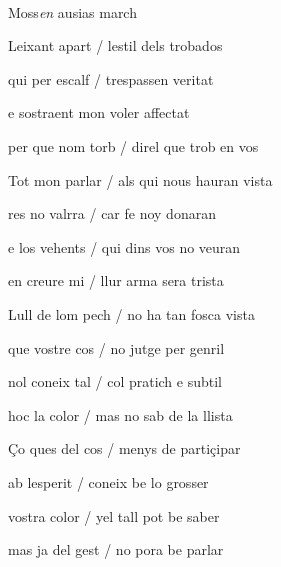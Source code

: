 \documentclass[12pt]{article}
\renewcommand{\espaiAbansEtiquetaPoema}{\vspace{0ex}}
\begin{document}
\begin{estrofa}

\espaiAbansEtiquetaPoema

\\

\begin{rubrica}

Moss\textit{en} ausias march

\end{rubrica}

\end{estrofa}


\begin{estrofa}

 Leixant apart / lestil dels trobados

 qui per escalf / trespassen veritat

 e sostraent mon voler affectat

 per que nom torb / direl que trob en vos

 Tot mon parlar / als qui nous hauran vista

 res no valrra / car fe noy donaran

 e los vehents / qui dins vos no veuran

 en creure mi / llur arma sera trista

\end{estrofa}



\begin{estrofa}

 Lull de lom pech / no ha tan fosca vista

 que vostre cos / no jutge per genril

 nol coneix tal / col pratich e subtil

 hoc la color / mas no sab de la llista

 \c{C}o ques del cos / menys de parti\c{c}ipar

 ab lesperit / coneix be lo grosser

 vostra color / yel tall pot be saber

 mas ja del gest / no pora be parlar

\end{estrofa}
\end{document}
